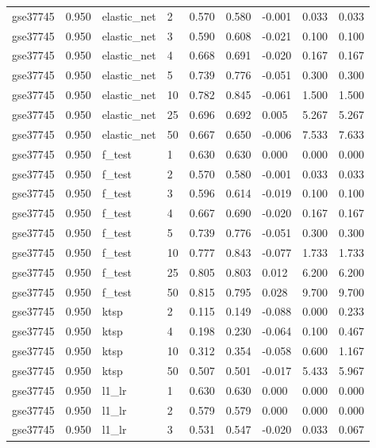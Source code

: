 \begin{table}[t]
\begin{tabular}{lllllllll}
    gse37745 & 0.950 & elastic\_net & 2 & 0.570 & 0.580 & -0.001 & 0.033 & 0.033 \\
    gse37745 & 0.950 & elastic\_net & 3 & 0.590 & 0.608 & -0.021 & 0.100 & 0.100 \\
    gse37745 & 0.950 & elastic\_net & 4 & 0.668 & 0.691 & -0.020 & 0.167 & 0.167 \\
    gse37745 & 0.950 & elastic\_net & 5 & 0.739 & 0.776 & -0.051 & 0.300 & 0.300 \\
    gse37745 & 0.950 & elastic\_net & 10 & 0.782 & 0.845 & -0.061 & 1.500 & 1.500 \\
    gse37745 & 0.950 & elastic\_net & 25 & 0.696 & 0.692 & 0.005 & 5.267 & 5.267 \\
    gse37745 & 0.950 & elastic\_net & 50 & 0.667 & 0.650 & -0.006 & 7.533 & 7.633 \\
    gse37745 & 0.950 & f\_test & 1 & 0.630 & 0.630 & 0.000 & 0.000 & 0.000 \\
    gse37745 & 0.950 & f\_test & 2 & 0.570 & 0.580 & -0.001 & 0.033 & 0.033 \\
    gse37745 & 0.950 & f\_test & 3 & 0.596 & 0.614 & -0.019 & 0.100 & 0.100 \\
    gse37745 & 0.950 & f\_test & 4 & 0.667 & 0.690 & -0.020 & 0.167 & 0.167 \\
    gse37745 & 0.950 & f\_test & 5 & 0.739 & 0.776 & -0.051 & 0.300 & 0.300 \\
    gse37745 & 0.950 & f\_test & 10 & 0.777 & 0.843 & -0.077 & 1.733 & 1.733 \\
    gse37745 & 0.950 & f\_test & 25 & 0.805 & 0.803 & 0.012 & 6.200 & 6.200 \\
    gse37745 & 0.950 & f\_test & 50 & 0.815 & 0.795 & 0.028 & 9.700 & 9.700 \\
    gse37745 & 0.950 & ktsp & 2 & 0.115 & 0.149 & -0.088 & 0.000 & 0.233 \\
    gse37745 & 0.950 & ktsp & 4 & 0.198 & 0.230 & -0.064 & 0.100 & 0.467 \\
    gse37745 & 0.950 & ktsp & 10 & 0.312 & 0.354 & -0.058 & 0.600 & 1.167 \\
    gse37745 & 0.950 & ktsp & 50 & 0.507 & 0.501 & -0.017 & 5.433 & 5.967 \\
    gse37745 & 0.950 & l1\_lr & 1 & 0.630 & 0.630 & 0.000 & 0.000 & 0.000 \\
    gse37745 & 0.950 & l1\_lr & 2 & 0.579 & 0.579 & 0.000 & 0.000 & 0.000 \\
    gse37745 & 0.950 & l1\_lr & 3 & 0.531 & 0.547 & -0.020 & 0.033 & 0.067 \\

\end{tabular}
\end{table}
